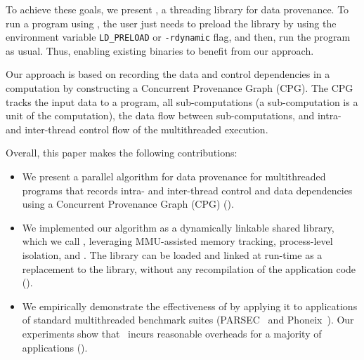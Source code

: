 To achieve these goals, we present \projecttitle, a threading library for data provenance. To run a program using \projecttitle,  the user just needs to preload the \projecttitle library  by using the environment variable {\tt LD\_PRELOAD} or {\tt -rdynamic} flag, and then, run the program as usual. Thus, enabling existing binaries to benefit from our approach. 


Our approach is based on recording the data and control dependencies in a computation by constructing a Concurrent Provenance Graph (CPG). The CPG tracks the input data to a program, all sub-computations (a sub-computation is a unit of the computation), the data flow between sub-computations, and intra- and inter-thread control flow of the multithreaded execution.


Overall, this paper makes the following contributions:
\begin{itemize}

\item We present a parallel algorithm for data provenance for multithreaded programs that records intra- and inter-thread control and data dependencies using a Concurrent Provenance Graph (CPG) ().

\item We implemented our algorithm as a dynamically linkable shared library, which we call \projecttitle, leveraging MMU-assisted memory tracking, process-level isolation, and \intelpt.  The \projecttitle library can be loaded and linked at run-time as a replacement to the \pthreads library, without any recompilation  of the application code ().

\item  We  empirically demonstrate  the effectiveness of \projecttitle by applying it to applications of standard multithreaded benchmark suites (PARSEC~\cite{parsec} and Phoneix~\cite{phoenix}). Our experiments show that \projecttitle~incurs reasonable overheads for a majority of applications (). 

\end{itemize}



